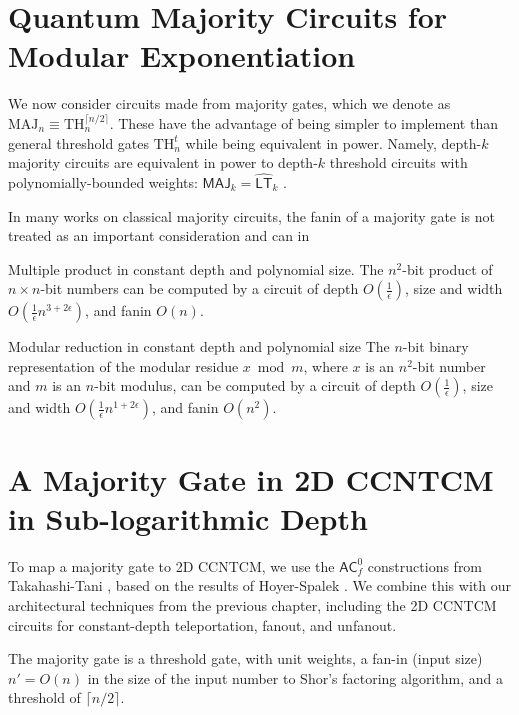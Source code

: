 \section{Quantum Majority Circuits for Modular Exponentiation}

We now consider circuits made from majority gates, which we denote
as $\text{MAJ}_n \equiv \text{TH}^{\lceil n/2 \rceil}_n$. These have the
advantage of being simpler to implement than general threshold gates
$\text{TH}^t_n$ while being equivalent in power. Namely, depth-$k$
majority circuits are equivalent in power to depth-$k$ threshold circuits
with polynomially-bounded weights: $\textsf{MAJ}_k = \hat{\textsf{LT}}_k$
\cite{Alon1994,Goldmann1994}.

In many works on classical majority circuits, the fanin of a majority
gate is not treated as an important consideration and can in 

\begin{theorem}{Multiple product in constant depth and polynomial size.\cite{Yeh1996}}
The $n^2$-bit product of $n\times n$-bit numbers can be computed by a
circuit of depth $O(\frac{1}{\epsilon})$,
size and width $O(\frac{1}{\epsilon}n^{3+2\epsilon})$, and
fanin $O(n)$.
\end{theorem}

\begin{theorem}{Modular reduction in constant depth and polynomial size \cite{Yeh1996}}
The $n$-bit binary representation of the modular residue $x \bmod m$, where
$x$ is an $n^2$-bit number and $m$ is an $n$-bit modulus, can be computed
by a circuit of depth $O(\frac{1}{\epsilon})$,
size and width $O(\frac{1}{\epsilon}n^{1 + 2\epsilon})$, and
fanin $O(n^2)$.
\end{theorem}



\section{A Majority Gate in 2D CCNTCM in Sub-logarithmic Depth}

To map a majority gate to 2D CCNTCM, we use the $\textsf{AC}_f^0$ 
constructions from Takahashi-Tani \cite{Takahashi2011},
based on the results of
Hoyer-Spalek \cite{Hoyer2002}.
We combine this with our architectural techniques
from the previous chapter, including the 2D CCNTCM circuits
for constant-depth teleportation, fanout, and unfanout.

The majority gate is a threshold gate, with unit weights, a
fan-in (input size) $n' = O(n)$ in the size of the input number to Shor's 
factoring algorithm, and a threshold of $\lceil n/2 \rceil$.

